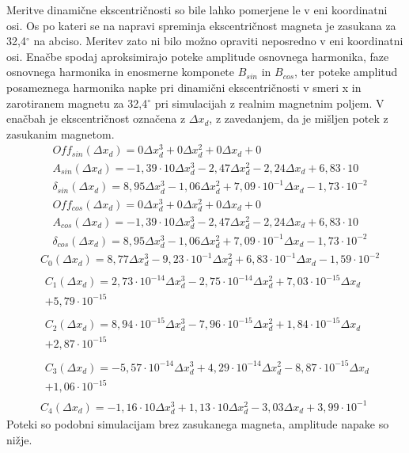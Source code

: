 Meritve dinamične ekscentričnosti so bile lahko pomerjene le v eni koordinatni osi. Os po kateri se na napravi spreminja ekscentričnost magneta je zasukana za 32,4$^\circ$ na abciso. Meritev zato ni bilo možno opraviti neposredno v eni koordinatni osi. Enačbe spodaj aproksimirajo poteke amplitude osnovnega harmonika, faze osnovnega harmonika in enosmerne komponete $B_{sin}$ in $B_{cos}$, ter poteke amplitud posameznega harmonika napke pri dinamični ekscentričnosti v smeri x in zarotiranem magnetu za 32,4$^\circ$ pri simulacijah z realnim magnetnim poljem. V enačbah je ekscentričnost označena z $\Delta x_{d}$, z zavedanjem, da je mišljen potek z zasukanim magnetom. 
\begin{eqnarray}
&Off_{sin}(\Delta x_d) = 0\Delta x_d^{3}+0\Delta x_d^{2}+0\Delta x_d+0 \\
&A_{sin}(\Delta x_d) =-1,39\cdot 10\Delta x_d^{3}-2,47\Delta x_d^{2}-2,24\Delta x_d+6,83\cdot 10 \\                                      
&\delta_{sin}(\Delta x_d) =8,95\Delta x_d^{3}-1,06\Delta x_d^{2}+7,09\cdot 10^{-1}\Delta x_d-1,73\cdot 10^{-2}  \\                             
&Off_{cos}(\Delta x_d) = 0\Delta x_d^{3}+0\Delta x_d^{2}+0\Delta x_d+0 \\
&A_{cos}(\Delta x_d) =-1,39\cdot 10\Delta x_d^{3}-2,47\Delta x_d^{2}-2,24\Delta x_d+6,83\cdot 10 \\                                      
&\delta_{cos}(\Delta x_d) =8,95\Delta x_d^{3}-1,06\Delta x_d^{2}+7,09\cdot 10^{-1}\Delta x_d-1,73\cdot 10^{-2} 
\end{eqnarray}
\begin{eqnarray}
&C_0(\Delta x_d) =8,77\Delta x_d^{3}-9,23\cdot 10^{-1}\Delta x_d^{2}+6,83\cdot 10^{-1}\Delta x_d-1,59\cdot 10^{-2} \\                  
&\begin{split}C_1(\Delta x_d) =2,73\cdot 10^{-14}\Delta x_d^{3}-2,75\cdot 10^{-14}\Delta x_d^{2}+7,03\cdot 10^{-15}\Delta x_d\\+5,79\cdot 10^{-15}\end{split} \\ 
&\begin{split}C_2(\Delta x_d) =8,94\cdot 10^{-15}\Delta x_d^{3}-7,96\cdot 10^{-15}\Delta x_d^{2}+1,84\cdot 10^{-15}\Delta x_d\\+2,87\cdot 10^{-15}\end{split} \\ 
&\begin{split}C_3(\Delta x_d) =-5,57\cdot 10^{-14}\Delta x_d^{3}+4,29\cdot 10^{-14}\Delta x_d^{2}-8,87\cdot 10^{-15}\Delta x_d\\+1,06\cdot 10^{-15}\end{split} \\
&C_4(\Delta x_d) =-1,16\cdot 10\Delta x_d^{3}+1,13\cdot 10\Delta x_d^{2}-3,03\Delta x_d+3,99\cdot 10^{-1} 
\end{eqnarray}
Poteki so podobni simulacijam brez zasukanega magneta, amplitude napake so nižje.

